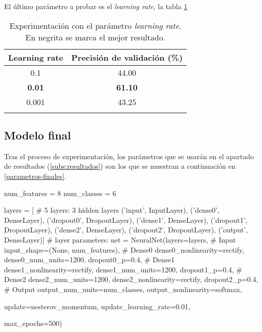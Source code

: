 El último parámetro a probar es el \textit{learning rate}, la tabla \ref{tab:learning-rate}

\begin{table}[htp]
\caption{Experimentación con el parámetro \textit{learning rate}. En negrita se marca el mejor resultado.}
\centering
\begin{tabular}{c c}
\toprule
\textbf{Learning rate} &  \textbf{Precisión de validación (\%)} \\
\midrule
  0.1    &  44.00  \\
  \textbf{0.01}   &  \textbf{61.10}  \\
  0.001  &  43.25  \\

\bottomrule\\

\end{tabular}
\label{tab:learning-rate}
\end{table}







\newpage




\subsection{Modelo final}

Tras el proceso de experimentación, los parámetros que se usarán en el apartado de resultados (\ref{subs:resultados}) son los que se muestran a continuación en \ref{parametros-finales}.

\begin{python}[frame=none, numbers=left, label={parametros-finales}, caption={Configuración de las capas de la red neuronal y sus parámetros finales marcados en negrita}]
num_features = 8
num_classes = 6

layers = [  # 5 layers: 3 hidden layers
          ('input', InputLayer),
          ('dense0', DenseLayer),
          ('dropout0', DropoutLayer),
          ('dense1', DenseLayer),
          ('dropout1', DropoutLayer),
          ('dense2', DenseLayer),
          ('dropout2', DropoutLayer),
          ('output', DenseLayer)]
# layer parameters:
net = NeuralNet(layers=layers,
                # Input
                input_shape=(None, num_features),
                # Dense0
                dense0_nonlinearity=rectify,
                dense0_num_units=1200,
                dropout0_p=0.4,
                # Dense1
                dense1_nonlinearity=rectify,
                dense1_num_units=1200,
                dropout1_p=0.4,
                # Dense2
                dense2_num_units=1200,
                dense2_nonlinearity=rectify,
                dropout2_p=0.4,
                # Output
                output_num_units=num_classes,
                output_nonlinearity=softmax,

                update=nesterov_momentum,
                update_learning_rate=0.01,

                max_epochs=500)
\end{python}

